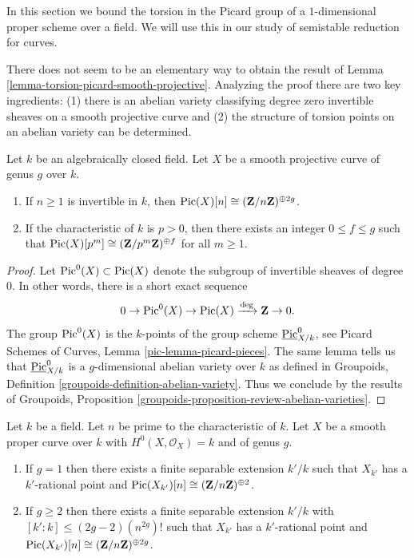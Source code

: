 \noindent
In this section we bound the torsion in the Picard group of a $1$-dimensional
proper scheme over a field. We will use this in our
study of semistable reduction for curves.

\medskip\noindent
There does not seem to be an elementary way to obtain the result of
Lemma \ref{lemma-torsion-picard-smooth-projective}.
Analyzing the proof there are two key ingredients:
(1) there is an abelian variety classifying degree zero invertible sheaves on
a smooth projective curve and (2) the structure of torsion points on
an abelian variety can be determined.

\begin{lemma}
\label{lemma-torsion-picard-smooth-projective}
Let $k$ be an algebraically closed field.
Let $X$ be a smooth projective curve of genus $g$ over $k$.
\begin{enumerate}
\item If $n \geq 1$ is invertible in $k$, then
$\mathop{\mathrm{Pic}}\nolimits(X)[n] \cong (\mathbf{Z}/n\mathbf{Z})^{\oplus 2g}$.
\item If the characteristic of $k$ is $p > 0$, then there exists
an integer $0 \leq f \leq g$ such that
$\mathop{\mathrm{Pic}}\nolimits(X)[p^m] \cong (\mathbf{Z}/p^m\mathbf{Z})^{\oplus f}$ for
all $m \geq 1$.
\end{enumerate}
\end{lemma}

\begin{proof}
Let $\mathop{\mathrm{Pic}}\nolimits^0(X) \subset \mathop{\mathrm{Pic}}\nolimits(X)$
denote the subgroup of invertible sheaves of degree $0$.
In other words, there is a short exact sequence
$$
0 \to \mathop{\mathrm{Pic}}\nolimits^0(X) \to \mathop{\mathrm{Pic}}\nolimits(X) \xrightarrow{\deg} \mathbf{Z} \to 0.
$$
The group $\mathop{\mathrm{Pic}}\nolimits^0(X)$ is the $k$-points of
the group scheme $\underline{\mathrm{Pic}}^0_{X/k}$, see
Picard Schemes of Curves, Lemma \ref{pic-lemma-picard-pieces}.
The same lemma tells us that $\underline{\mathrm{Pic}}^0_{X/k}$
is a $g$-dimensional abelian variety over $k$ as defined in
Groupoids, Definition \ref{groupoids-definition-abelian-variety}.
Thus we conclude by the results of
Groupoids, Proposition \ref{groupoids-proposition-review-abelian-varieties}.
\end{proof}

\begin{lemma}
\label{lemma-torsion-picard-becomes-visible}
Let $k$ be a field. Let $n$ be prime to the characteristic of $k$.
Let $X$ be a smooth proper curve over $k$ with $H^0(X, \mathcal{O}_X) = k$
and of genus $g$.
\begin{enumerate}
\item If $g = 1$ then there exists a finite separable extension
$k'/k$ such that $X_{k'}$ has a $k'$-rational point and
$\mathop{\mathrm{Pic}}\nolimits(X_{k'})[n] \cong (\mathbf{Z}/n\mathbf{Z})^{\oplus 2}$.
\item If $g \geq 2$ then there exists a finite separable extension
$k'/k$ with $[k' : k] \leq (2g - 2)(n^{2g})!$
such that $X_{k'}$ has a $k'$-rational point and
$\mathop{\mathrm{Pic}}\nolimits(X_{k'})[n] \cong (\mathbf{Z}/n\mathbf{Z})^{\oplus 2g}$.
\end{enumerate}
\end{lemma}

